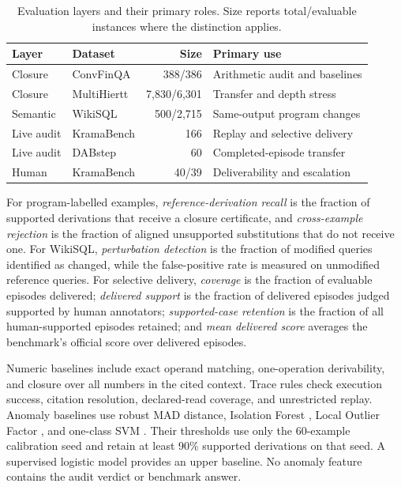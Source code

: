 \begin{table}[t]
\centering
\caption{Evaluation layers and their primary roles. Size reports
total/evaluable instances where the distinction applies.}
\label{tab:datasets}
\scriptsize
\renewcommand{\arraystretch}{1.05}
\setlength{\tabcolsep}{2.5pt}
\begin{tabularx}{\columnwidth}{@{}l l r X@{}}
\toprule
Layer & Dataset & Size & Primary use \\
\midrule
Closure
& ConvFinQA
& 388/386
& Arithmetic audit and baselines \\

Closure
& MultiHiertt
& 7,830/6,301
& Transfer and depth stress \\

Semantic
& WikiSQL
& 500/2,715
& Same-output program changes \\

Live audit
& KramaBench
& 166
& Replay and selective delivery \\

Live audit
& DABstep
& 60
& Completed-episode transfer \\

Human
& KramaBench
& 40/39
& Deliverability and escalation \\
\bottomrule
\end{tabularx}
\end{table}

For program-labelled examples, \emph{reference-derivation recall}
is the fraction of supported derivations that receive a closure
certificate, and \emph{cross-example rejection} is the fraction
of aligned unsupported substitutions that do not receive one.
For WikiSQL, \emph{perturbation detection} is the fraction of
modified queries identified as changed, while the false-positive
rate is measured on unmodified reference queries. For selective
delivery, \emph{coverage} is the fraction of evaluable episodes
delivered; \emph{delivered support} is the fraction of delivered
episodes judged supported by human annotators;
\emph{supported-case retention} is the fraction of all
human-supported episodes retained; and \emph{mean delivered
score} averages the benchmark's official score over delivered
episodes.

Numeric baselines include exact operand matching, one-operation
derivability, and closure over all numbers in the cited context.
Trace rules check execution success, citation resolution,
declared-read coverage, and unrestricted replay. Anomaly baselines
use robust MAD distance, Isolation Forest
\citep{liu2008isolation}, Local Outlier Factor
\citep{breunig2000lof}, and one-class SVM
\citep{scholkopf2001support}. Their thresholds use only the
60-example calibration seed and retain at least 90\% supported
derivations on that seed. A supervised logistic model provides an
upper baseline. No anomaly feature contains the audit verdict or
benchmark answer.

